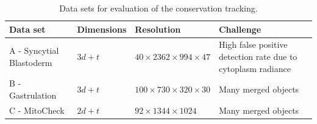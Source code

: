 \begin{table}
    \centering
    \begin{tabularx}{\textwidth}{Xp{2cm}XX}
        \toprule
        Data set & Dimensions & Resolution & Challenge \\ \midrule
        A - Syncytial Blastoderm & $3d+t$ &  $40\times2362\times994\times47$& High false positive
        detection rate
        due to cytoplasm radiance \\
        B - Gastrulation & $3d+t$ & $100 \times 730 \times 320 \times 30$ & Many merged objects \\
        C - MitoCheck & $2d+t$ & $92\times1344\times1024$ & Many merged objects \\
        \bottomrule
    \end{tabularx}
    \caption[Data sets for evaluation of the conservation tracking]{Data sets for evaluation of the
        conservation tracking.}
    \label{tab:gmm-evaluation-data}
\end{table}

